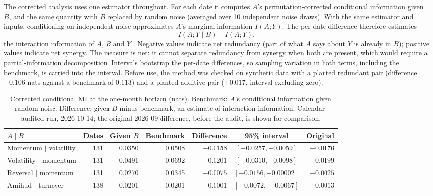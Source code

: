 \documentclass[11pt]{article}
\begin{document}
The corrected analysis uses one estimator throughout. For each date it computes $A$'s
permutation-corrected conditional information given $B$, and the same quantity with
$B$ replaced by random noise (averaged over 10 independent noise draws). With the same
estimator and inputs, conditioning on independent noise approximates $A$'s marginal
information $I(A;Y)$. The per-date difference therefore estimates
\[
I(A;Y\mid B) - I(A;Y),
\]
the interaction information of $A$, $B$ and $Y$ \citep{mcgill1954}. Negative values
indicate net redundancy (part of what $A$ says about $Y$ is already in $B$); positive
values indicate net synergy. The measure is net: it cannot separate redundancy from
synergy when both are present, which would require a partial-information
decomposition. Intervals bootstrap the per-date differences, so sampling variation in
both terms, including the benchmark, is carried into the interval. Before use, the
method was checked on synthetic data with a planted redundant pair (difference
$-0.106$ nats against a benchmark of $0.113$) and a planted additive pair ($+0.017$,
interval excluding zero).

\begin{table}[t]
\centering\small
\caption{Corrected conditional MI at the one-month horizon (nats). Benchmark: $A$'s
conditional information given random noise. Difference: given $B$ minus benchmark,
an estimate of interaction information. Calendar-audited run, 2026-10-14; the
original 2026-09 difference, before the audit, is shown for comparison.}
\label{tab:cmi}
\setlength{\tabcolsep}{4pt}
\begin{tabular}{lrrrrcr}
\toprule
$A \mid B$ & Dates & Given $B$ & Benchmark & Difference & 95\% interval & Original \\
\midrule
Momentum $\mid$ volatility & 131 & 0.0350 & 0.0508 & $-0.0158$ & $[-0.0257, -0.0059]$ & $-0.0176$ \\
Volatility $\mid$ momentum & 131 & 0.0491 & 0.0692 & $-0.0201$ & $[-0.0310, -0.0098]$ & $-0.0199$ \\
Reversal $\mid$ momentum   & 131 & 0.0270 & 0.0345 & $-0.0075$ & $[-0.0156, -0.00002]$ & $-0.0025$ \\
Amihud $\mid$ turnover     & 138 & 0.0201 & 0.0201 & $\phantom{-}0.0001$ & $[-0.0072, \phantom{-}0.0067]$ & $-0.0013$ \\
\bottomrule
\end{tabular}
\end{table}
\end{document}
